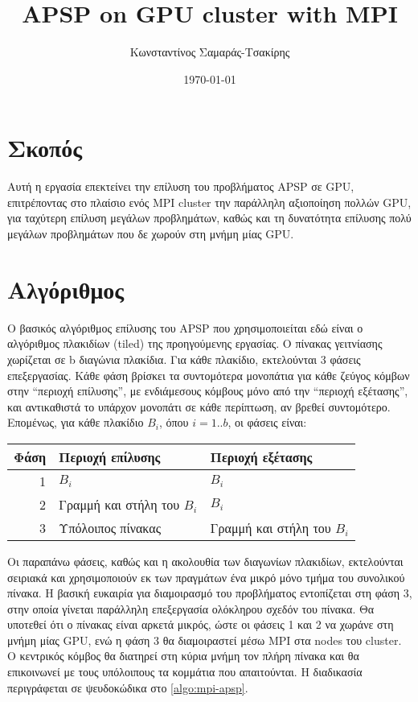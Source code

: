 \documentclass[a4paper,10pt]{article}
\title{APSP on GPU cluster with MPI}
\author{Κωνσταντίνος Σαμαράς-Τσακίρης}
\date{\today}
\begin{document}
\maketitle

\section*{Σκοπός}
  Αυτή η εργασία επεκτείνει την επίλυση του προβλήματος APSP σε GPU, επιτρέποντας στο πλαίσιο ενός MPI cluster την παράλληλη αξιοποίηση πολλών GPU, για ταχύτερη επίλυση μεγάλων προβλημάτων, καθώς και τη  δυνατότητα επίλυσης πολύ μεγάλων προβλημάτων που δε χωρούν στη μνήμη μίας GPU.

\section{Αλγόριθμος}
  Ο βασικός αλγόριθμος επίλυσης του APSP που χρησιμοποιείται εδώ είναι ο αλγόριθμος πλακιδίων (tiled) της προηγούμενης εργασίας. Ο πίνακας γειτνίασης χωρίζεται σε b διαγώνια πλακίδια. Για κάθε πλακίδιο, εκτελούνται 3 φάσεις επεξεργασίας. Κάθε φάση βρίσκει τα συντομότερα μονοπάτια για κάθε ζεύγος κόμβων στην ``περιοχή επίλυσης'', με ενδιάμεσους κόμβους μόνο από την ``περιοχή εξέτασης'', και αντικαθιστά το υπάρχον μονοπάτι σε κάθε περίπτωση, αν βρεθεί συντομότερο. Επομένως, για κάθε πλακίδιο $B_i$, όπου $i=1..b$, οι φάσεις είναι:

  \begin{tabular}{r| l l}
	Φάση & Περιοχή επίλυσης & Περιοχή εξέτασης \\ \hline
	1	 & $B_i$			& $B_i$			   \\
	2	 & Γραμμή και στήλη του $B_i$ & $B_i$  \\
	3	 & Υπόλοιπος πίνακας & Γραμμή και στήλη του $B_i$ \\
  \end{tabular}

  Οι παραπάνω φάσεις, καθώς και η ακολουθία των διαγωνίων πλακιδίων, εκτελούνται σειριακά και χρησιμοποιούν εκ των πραγμάτων ένα μικρό μόνο τμήμα του συνολικού πίνακα. Η βασική ευκαιρία για διαμοιρασμό του προβλήματος εντοπίζεται στη φάση 3, στην οποία γίνεται παράλληλη επεξεργασία ολόκληρου σχεδόν του πίνακα. Θα υποτεθεί ότι ο πίνακας είναι αρκετά μικρός, ώστε οι φάσεις 1 και 2 να χωράνε στη μνήμη μίας GPU, ενώ η φάση 3 θα διαμοιραστεί μέσω MPI στα nodes του cluster. Ο κεντρικός κόμβος θα διατηρεί στη κύρια μνήμη τον πλήρη πίνακα και θα επικοινωνεί με τους υπόλοιπους τα κομμάτια που απαιτούνται.
  Η διαδικασία περιγράφεται σε ψευδοκώδικα στο \ref{algo:mpi-apsp}.
\end{document}
